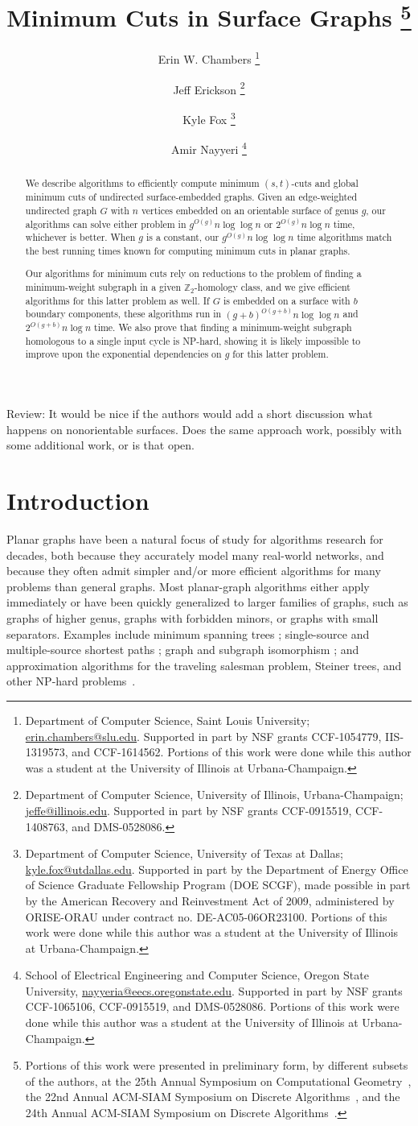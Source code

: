 \documentclass[letterpaper,review]{siamart190516}
\title{Minimum Cuts in Surface Graphs%
\thanks{
Portions of this work were presented in preliminary form, by different subsets of the authors, at
the 25th Annual Symposium on Computational Geometry~\cite{cen-mcshc-09}, the 22nd Annual ACM-SIAM
Symposium on Discrete Algorithms~\cite{en-mcsnc-11}, and the 24th Annual ACM-SIAM Symposium on Discrete Algorithms~\cite{efn-gmcse-12}.
}}
\author{
Erin W. Chambers%
	\thanks{Department of Computer Science,
	Saint Louis University;
	\url{erin.chambers@slu.edu}.
	Supported in part by NSF grants CCF-1054779, IIS-1319573, and CCF-1614562.
	Portions of this work were done while this author was a student at the University of Illinois at Urbana-Champaign.}
%
\and
Jeff Erickson%
	\thanks{Department of Computer Science,
	University of Illinois, Urbana-Champaign;
	\url{jeffe@illinois.edu}.
	Supported in part by NSF grants CCF-0915519, CCF-1408763, and DMS-0528086.
  }
%
\and
Kyle Fox%
	\thanks{Department of Computer Science,
	University of Texas at Dallas;
	\url{kyle.fox@utdallas.edu}.
	Supported in part by the Department of Energy Office of Science Graduate Fellowship Program (DOE SCGF), made possible in part by the American Recovery and Reinvestment Act of 2009, administered by ORISE-ORAU under contract no. DE-AC05-06OR23100.
	Portions of this work were done while this author was a student at the University of Illinois at Urbana-Champaign.}
%
\and
Amir Nayyeri%
	\thanks{School of Electrical Engineering and Computer Science,
	Oregon State University,
	\url{nayyeria@eecs.oregonstate.edu}.
	Supported in part by NSF grants CCF-1065106, CCF-0915519, and DMS-0528086.
	Portions of this work were done while this author was a student at the University of Illinois at Urbana-Champaign.}
}
\def\Z{\mathbb{Z}}
\def\rnote#1{\color{red}Review: #1 \color{black}}
\begin{document}
\maketitle
\begin{abstract}
We describe algorithms to efficiently compute minimum $(s,t)$-cuts and global minimum cuts of
undirected surface-embedded graphs.
Given an edge-weighted undirected graph $G$ with $n$ vertices embedded on an orientable surface of
genus $g$, our algorithms can solve either problem in $g^{O(g)} n \log \log n$ or $2^{O(g)} n \log
n$ time, whichever is better.
When $g$ is a constant, our $g^{O(g)} n \log \log n$ time algorithms match the best running times
known for computing minimum cuts in planar graphs.

Our algorithms for minimum cuts rely on reductions to the problem of finding a minimum-weight
subgraph in a given \(\Z_2\)-homology class, and we give efficient algorithms for this latter
problem as well.
If $G$ is embedded on a surface with $b$ boundary components, these algorithms run in $(g + b)^{O(g
+ b)} n \log \log n$ and $2^{O(g + b)} n \log n$ time.
We also prove that finding a minimum-weight subgraph homologous to a single input cycle is NP-hard,
showing it is likely impossible to improve upon the exponential dependencies on $g$ for this latter
problem.
\end{abstract}

\rnote{
It would be nice if the authors would add a short discussion what happens on nonorientable surfaces. Does the same approach work, possibly with some additional work, or is that open. 
}

\section{Introduction}
\label{sec:intro}


Planar graphs have been a natural focus of study for algorithms research for decades, both because
they accurately model many real-world networks, and because they often admit simpler and/or more
efficient algorithms for many problems than general graphs.  Most planar-graph algorithms either
apply immediately or have been quickly generalized to larger families of graphs, such as graphs of
higher genus, graphs with forbidden minors, or graphs with small separators.  Examples include
minimum spanning trees \cite{p-omst-99, m-tltam-04}; single-source and multiple-source shortest
paths \cite{cce-msspe-13, fr-pgnwe-06, hkrs-fspap-97, k-msspp-05, kmw-spdpg-09, lrt-gnd-79,
tm-spltm-09, efl-hmcpf-18}; graph and subgraph isomorphism \cite{g-itegd-00, hw-ltaip-74,
m-itgbg-80, e-sipgr-99, e-dtmcg-00}; and approximation algorithms for the traveling salesman
problem, Steiner trees, and other NP-hard problems~\cite{bdt-passp-14, bkk-ptass-07, bkk-stpg-07,
dhm-aacd-07, e-dtmcg-00, blw-mghls-17, gs-lsatw-02}.
\end{document}
